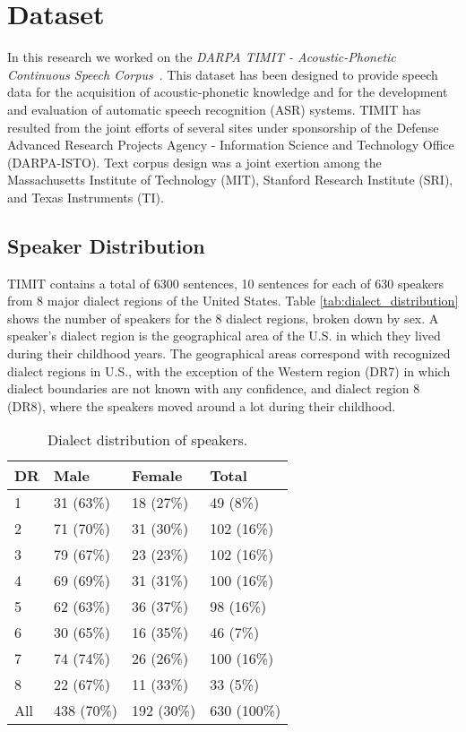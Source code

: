 \section{Dataset}\label{sec:dataset}

In this research we worked on the \textit{DARPA TIMIT - Acoustic-Phonetic Continuous Speech Corpus}~\cite{garofolo:timit}. This dataset has been designed to provide speech data for the acquisition of acoustic-phonetic knowledge and for the development and evaluation of automatic speech recognition (ASR) systems. TIMIT has resulted from the joint efforts of several sites under sponsorship of the Defense Advanced Research Projects Agency - Information Science and Technology Office (DARPA-ISTO). Text corpus design was a joint exertion among the Massachusetts Institute of Technology (MIT), Stanford Research Institute (SRI), and Texas Instruments (TI).

\subsection{Speaker Distribution}
TIMIT contains a total of 6300 sentences, 10 sentences for each of 630 speakers from 8 major dialect regions of the United States. Table \vref{tab:dialect_distribution} shows the number of speakers for the 8 dialect regions, broken down by sex. A speaker's dialect region is the geographical area of the U.S. in which they lived during their childhood years. The geographical areas correspond with recognized dialect regions in U.S., with the exception of the Western region (DR7) in which dialect boundaries are not known with any confidence, and dialect region 8 (DR8), where the speakers moved around a lot during their childhood.

\begin{table}
	\caption{Dialect distribution of speakers.}
	\label{tab:dialect_distribution}
	\centering
	\begin{tabularx}{0.5\textwidth}{llll}
		\toprule
		\textbf{DR} & \textbf{Male} & \textbf{Female} & \textbf{Total} \\
		\midrule
		1 & 31 (63\%) & 18 (27\%) & 49 (8\%) \\
		2 & 71 (70\%) & 31 (30\%) & 102 (16\%) \\
		3 & 79 (67\%) & 23 (23\%) & 102 (16\%) \\
		4 & 69 (69\%) & 31 (31\%) & 100 (16\%) \\
		5 & 62 (63\%) & 36 (37\%) & 98 (16\%) \\
		6 & 30 (65\%) & 16 (35\%) & 46 (7\%) \\
		7 & 74 (74\%) & 26 (26\%) & 100 (16\%) \\
		8 & 22 (67\%) & 11 (33\%) & 33 (5\%) \\
		\midrule
		All & 438 (70\%) & 192 (30\%) & 630 (100\%) \\
		\bottomrule
	\end{tabularx}
\end{table}

